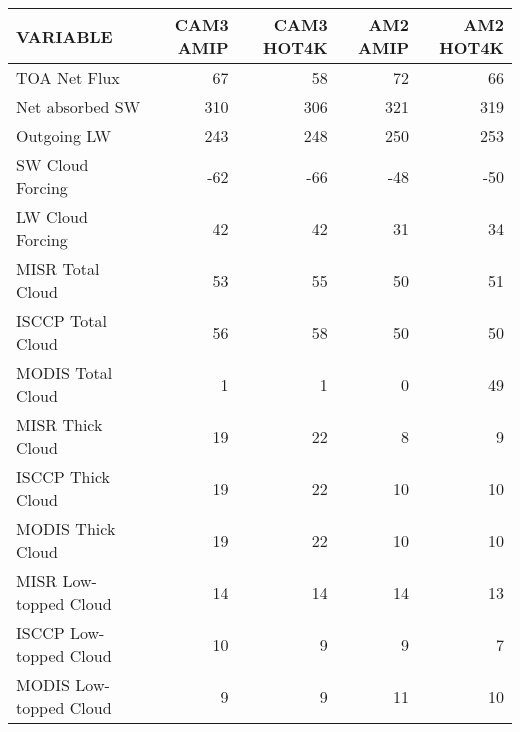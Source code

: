 \begin{tabular}{lrrrr}
\hline
                VARIABLE &                CAM3 AMIP &               CAM3 HOT4K &                 AM2 AMIP &                AM2 HOT4K \\ \hline
            TOA Net Flux &                       67 &                       58 &                       72 &                       66 \\
         Net absorbed SW &                      310 &                      306 &                      321 &                      319 \\
             Outgoing LW &                      243 &                      248 &                      250 &                      253 \\
        SW Cloud Forcing &                      -62 &                      -66 &                      -48 &                      -50 \\
        LW Cloud Forcing &                       42 &                       42 &                       31 &                       34 \\
        MISR Total Cloud &                       53 &                       55 &                       50 &                       51 \\
       ISCCP Total Cloud &                       56 &                       58 &                       50 &                       50 \\
       MODIS Total Cloud &                        1 &                        1 &                        0 &                       49 \\
        MISR Thick Cloud &                       19 &                       22 &                        8 &                        9 \\
       ISCCP Thick Cloud &                       19 &                       22 &                       10 &                       10 \\
       MODIS Thick Cloud &                       19 &                       22 &                       10 &                       10 \\
   MISR Low-topped Cloud &                       14 &                       14 &                       14 &                       13 \\
  ISCCP Low-topped Cloud &                       10 &                        9 &                        9 &                        7 \\
  MODIS Low-topped Cloud &                        9 &                        9 &                       11 &                       10 \\

\end{tabular}
